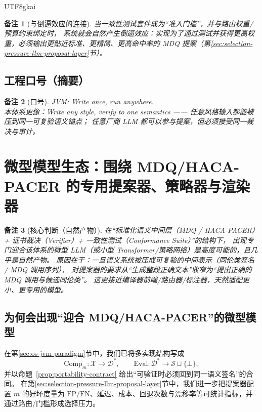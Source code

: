 \documentclass[12pt]{article}
\newtheorem{remark}{备注}[section]
\begin{document}
\begin{CJK*}{UTF8}{gkai}
\begin{remark}[与倒逼效应的连接]
当一致性测试套件成为“准入门槛”，并与路由权重/预算约束绑定时，
系统就会自然产生倒逼效应：实现为了通过测试并获得更高权重，必须输出更贴近标准、更精简、更高命中率的 MDQ 提案（第\ref{sec:selection-pressure-llm-proposal-layer}节）。
\end{remark}

\subsection{工程口号（摘要）}
\label{subsec:osjvm-slogan}

\begin{remark}[口号]
\textsf{JVM}: \emph{Write once, run anywhere.}\\
本体系更像：\emph{Write any style, verify to one semantics} —— 任意风格输入都能被压到同一可复验语义锚点；
任意厂商 LLM 都可以参与提案，但必须接受同一裁决与审计。
\end{remark}

\clearpage

\section{微型模型生态：围绕 MDQ/HACA-PACER 的专用提案器、策略器与渲染器}
\label{sec:micro-model-ecosystem}

\begin{remark}[核心判断（自然产物）]
在“标准化语义中间层（MDQ / HACA-PACER）+ 证书裁决（Verifier）+ 一致性测试（Conformance Suite）”的结构下，
出现专门迎合该体系的微型 LLM（或小型 Transformer/策略网络）是高度可能的，且几乎是自然产物。
原因在于：一旦语义系统被压成可复验的中间表示（同伦类签名 / MDQ 调用序列），
对提案器的要求从“生成整段正确文本”收窄为“提出正确的 MDQ 调用与候选同伦类”。
这更接近编译器前端/路由器/标注器，天然适配更小、更专用的模型。
\end{remark}

\subsection{为何会出现“迎合 MDQ/HACA-PACER”的微型模型}
\label{subsec:why-micro-models}

在第\ref{sec:os-jvm-paradigm}节中，我们已将多实现结构写成
\[
\mathrm{Comp}_m:\mathcal{X}\to \mathcal{D}^{\ast},
\qquad
\mathrm{Eval}:\mathcal{D}^{\ast}\to \mathcal{S}\sqcup\{\bot\},
\]
并以命题~\ref{prop:portability-contract} 给出“可验证时必须回到同一语义签名”的合同。
在第\ref{sec:selection-pressure-llm-proposal-layer}节中，我们进一步把提案器配置 $m$ 的好坏度量为
$\mathrm{FP}/\mathrm{FN}$、延迟、成本、回退次数与漂移率等可统计指标，并通过路由/门槛形成选择压力。


\end{CJK*}
\end{document}
